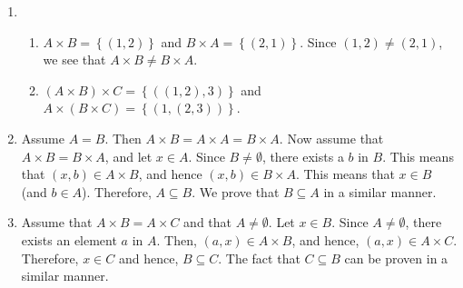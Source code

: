 \begin{enumerate}
\item \begin{enumerate}
\item $A \times B = \left\{ \left( 1, 2 \right) \right\}$ and 
$B \times A = \left\{ \left( 2, 1 \right) \right\}$.  Since 
$\left( 1, 2 \right) \ne \left( 2, 1 \right)$, we see that $A \times B \ne B \times A$.

\item $\left( A \times B \right) \times C = \left\{ \left( \left( 1, 2 \right), 3 \right) \right\}$ and
$A \times \left( B \times C \right) = \left\{ \left( 1, \left( 2, 3 \right) \right) \right\}$.
\end{enumerate} 

\item Assume $A = B$.  Then $A \times B = A \times A = B \times A$.  Now assume that 
$A \times B = B \times A$, and let $x \in A$.  Since $B \ne \emptyset$, there exists a $b$ in $B$.  This means that $\left( x, b \right) \in A \times B$, and hence 
$\left( x, b \right) \in B \times A$.  This means that $x \in B$ (and $b \in A$).  Therefore, 
$A \subseteq B$.  We prove that $B \subseteq A$ in a similar manner.

\item Assume that $A \times B = A \times C$ and that $A \ne \emptyset$.  Let $x \in B$.  Since 
$A \ne \emptyset$, there exists an element $a$ in $A$.  Then, 
$\left( a, x \right) \in A \times B$, and hence, $\left( a, x \right) \in A \times C$.  Therefore, 
$x \in C$ and hence, $B \subseteq C$.  The fact that $C \subseteq B$ can be proven in a similar manner.
\end{enumerate}




